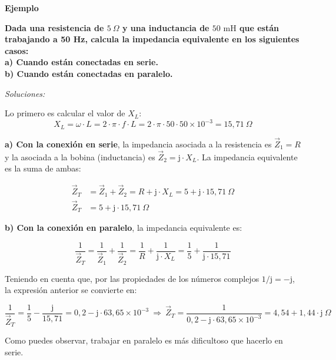 \documentclass[
  a4paper,
  DIV=11,
  numbers=noendperiod]{scrreprt}
\begin{document}
\vspace{1em}

\begin{tcolorbox}[enhanced jigsaw, breakable, colback=white, left=2mm, leftrule=.75mm, rightrule=.15mm, toprule=.15mm, colframe=quarto-callout-important-color-frame, arc=.35mm, bottomrule=.15mm, opacityback=0]

\vspace{-3mm}\textbf{Ejemplo}\vspace{3mm}

\textbf{Dada una resistencia de \(5 \ \Omega\) y una inductancia de
\(50 \text{ mH}\) que están trabajando a 50 Hz, calcula la impedancia
equivalente en los siguientes casos:}\\
\textbf{a) Cuando están conectadas en serie.}\\
\textbf{b) Cuando están conectadas en paralelo.}

\emph{Soluciones:}

Lo primero es calcular el valor de \(X_L\):
\[X_L = \omega \cdot L = 2 \cdot \pi \cdot f \cdot L = 2 \cdot \pi \cdot 50 \cdot 50 \times 10^{-3} = 15,71 \ \Omega\]

\textbf{a) Con la conexión en serie}, la impedancia asociada a la
resistencia es \(\vec{Z}_1 = R\) y la asociada a la bobina (inductancia)
es \(\vec{Z}_2 = \mathrm{j} \cdot X_L\). La impedancia equivalente es la
suma de ambas:

\[
\begin{aligned}
\vec{Z}_T &= \vec{Z}_1 + \vec{Z}_2 = R + \mathrm{j} \cdot X_L = 5 + \mathrm{j} \cdot 15,71 \ \Omega \\
\vec{Z}_T &= \boxed{5 + \mathrm{j} \cdot 15,71 \ \Omega}
\end{aligned}
\]

\textbf{b) Con la conexión en paralelo}, la impedancia equivalente es:

\[
\frac{1}{\vec{Z}_T} = \frac{1}{\vec{Z}_1} + \frac{1}{\vec{Z}_2} = \frac{1}{R} + \frac{1}{\mathrm{j} \cdot X_L} = \frac{1}{5} + \frac{1}{\mathrm{j} \cdot 15,71}
\]

Teniendo en cuenta que, por las propiedades de los números complejos
\(1/\mathrm{j} = -\mathrm{j}\), la expresión anterior se convierte en:

\[
\frac{1}{\vec{Z}_T} = \frac{1}{5} - \frac{\mathrm{j}}{15,71} = 0,2 - \mathrm{j} \cdot 63,65 \times 10^{-3} \ \Rightarrow \ \vec{Z}_T = \frac{1}{0,2 - \mathrm{j} \cdot 63,65 \times 10^{-3}} = \boxed{4,54 + 1,44 \cdot \mathrm{j} \ \Omega}
\]

Como puedes observar, trabajar en paralelo es más dificultoso que
hacerlo en serie.

\end{tcolorbox}
\end{document}
